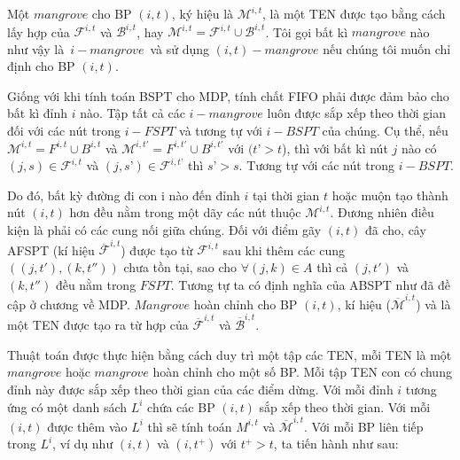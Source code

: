 \documentclass[../main.tex]{subfiles}
\begin{document}
\begin{definition}
\label{def:mangrove}
Một \(mangrove\) cho BP \((i, t)\), ký
hiệu là \(\mathcal M ^{i,t}\), là một TEN được tạo bằng cách lấy hợp của
\(\mathcal F^{i,t}\) và \(\mathcal B ^{i,t}\), hay
\(\mathcal M ^{i,t} = \mathcal F ^{i,t} \cup \mathcal B ^{i,t}\). Tôi gọi bất kì
\(mangrove\) nào như vậy là~\(i-mangrove\)~và sử dụng
\((i, t)-mangrove\) nếu chúng tôi muốn chỉ định cho BP
\((i, t)\).
\end{definition}

Giống với khi tính toán BSPT cho MDP, tính chất FIFO phải được đảm bảo
cho bất kì đỉnh \(i\) nào. Tập tất cả các \(i-mangrove\) luôn được sắp
xếp theo thời gian đối với các nút trong \(i-FSPT\) và tương tự với
\(i-BSPT\) của chúng. Cụ thể, nếu \(\mathcal M^{i, t}=F^{i,t}\cup B^{i,t}\)
và \(\mathcal M^{i, t'}=F^{i,t'}\cup B^{i,t'}\) với \((t’ > t\)), thì với
bất kì nút \(j\) nào có \((j,s) \in \mathcal F^{i, t}\) và
\((j,s’) \in \mathcal F^{i, t’}\) thì \(s’ > s\). Tương tự với các nút trong
\(i-BSPT\).

Do đó, bất kỳ đường đi con i nào đến đỉnh \(i\) tại thời gian \(t\) hoặc
muộn tạo thành nút \((i,t)\) hơn đều nằm trong một dãy các nút thuộc
\(\mathcal M^{i, t}\). Đương nhiên điều kiện là phải có các cung nối giữa
chúng. Đối với điểm gãy \((i, t)\) đã cho, cây AFSPT (kí hiệu
\(\mathcal{\overline{F}}^{i,t}\)) được tạo từ \(\mathcal F^{i,t}\) sau khi thêm
các cung \(((j, t'), (k, t''))\) chưa tồn tại, sao cho
\(\forall (j, k) \in A\) thì cả \((j,t')\) và \((k,t'')\) đều nằm trong
\(FSPT.\) Tương tự ta có định nghĩa của ABSPT như đã đề cập ở chương về
MDP. \(Mangrove\) hoàn chỉnh cho BP \((i, t)\), kí hiệu
(\(\overline{\mathcal M}^{i,t}\)) và là một TEN được tạo ra từ hợp của
\(\mathcal{\overline{F}}^{i,t}\) và \(\mathcal{\overline{B}}^{i,t}\).

Thuật toán được thực hiện bằng cách duy trì một tập các TEN, mỗi TEN là
một \(mangrove\) hoặc \(mangrove\) hoàn chỉnh cho một số BP. Mỗi
tập TEN con có chung đỉnh này được sắp xếp theo thời gian của các điểm
dừng. Với mỗi đỉnh \(i\) tương ứng có một danh sách \(L^i\) chứa các
BP \((i, t)\) sắp xếp theo thời gian. Với mỗi \((i, t)\) được
thêm vào \(L^i\) thì sẽ tính toán \(M^{i, t}\) và
\(\overline{\mathcal M}^{i,t}\). Với mỗi BP liên tiếp trong \(L^i\),
ví dụ như \((i,t)\) và \((i,t^+)\) với \(t^+ > t\), ta tiến hành như
sau:
\end{document}
